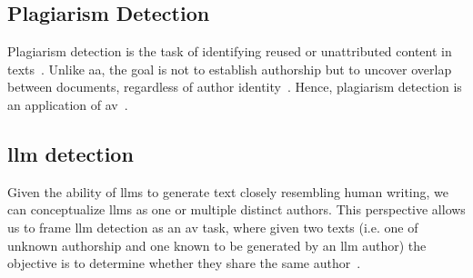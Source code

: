 \subsection{Plagiarism Detection}
Plagiarism detection is the task of identifying reused or unattributed content in texts~\citep{stein_intrinsic_2011,gohsen_task_oriented_2024}. 
Unlike \ac{aa}, the goal is not to establish authorship but to uncover overlap between documents, regardless of author identity~\citep{elmanarelbouanani_authorship_2014}.
Hence, plagiarism detection is an application of \ac{av}~\citep{rivera_soto_learning_2021}.


\subsection{\ac{llm} detection}
Given the ability of \acp{llm} to generate text closely resembling human writing, we can conceptualize \acp{llm} as one or multiple distinct authors.
This perspective allows us to frame \ac{llm} detection as an \ac{av} task, where given two texts (i.e. one of unknown authorship and one known to be generated by an \ac{llm} author) the objective is to determine whether they share the same author~\citep{llm_detection_av_2025}.


